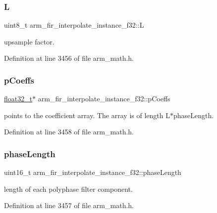 \subsubsection{\texorpdfstring{L}{L}}
{\footnotesize\ttfamily uint8\+\_\+t arm\+\_\+fir\+\_\+interpolate\+\_\+instance\+\_\+f32\+::L}

upsample factor. 

Definition at line 3456 of file arm\+\_\+math.\+h.

\mbox{\label{structarm__fir__interpolate__instance__f32_a86053b715980a93c9df630d6de5bb63c}} 
\subsubsection{\texorpdfstring{p\+Coeffs}{pCoeffs}}
{\footnotesize\ttfamily \hyperlink{arm__math_8h_a4611b605e45ab401f02cab15c5e38715}{float32\+\_\+t}$\ast$ arm\+\_\+fir\+\_\+interpolate\+\_\+instance\+\_\+f32\+::p\+Coeffs}

points to the coefficient array. The array is of length L$\ast$phase\+Length. 

Definition at line 3458 of file arm\+\_\+math.\+h.

\mbox{\label{structarm__fir__interpolate__instance__f32_a389e669e13ec56292a70db8e92194b12}} 
\subsubsection{\texorpdfstring{phase\+Length}{phaseLength}}
{\footnotesize\ttfamily uint16\+\_\+t arm\+\_\+fir\+\_\+interpolate\+\_\+instance\+\_\+f32\+::phase\+Length}

length of each polyphase filter component. 

Definition at line 3457 of file arm\+\_\+math.\+h.

